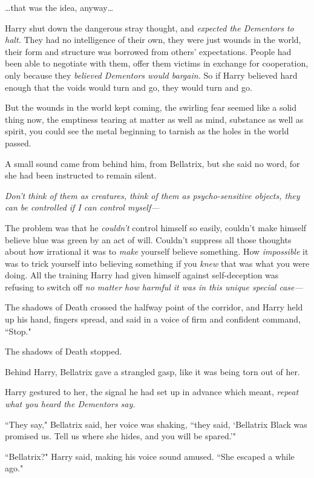 {\ldots}that was the idea, anyway{\ldots}

Harry shut down the dangerous stray thought, and \emph{expected the Dementors to halt.} They had no intelligence of their own, they were just wounds in the world, their form and structure was borrowed from others' expectations. People had been able to negotiate with them, offer them victims in exchange for cooperation, only because they \emph{believed Dementors would bargain.} So if Harry believed hard enough that the voids would turn and go, they would turn and go.

But the wounds in the world kept coming, the swirling fear seemed like a solid thing now, the emptiness tearing at matter as well as mind, substance as well as spirit, you could see the metal beginning to tarnish as the holes in the world passed.

A small sound came from behind him, from Bellatrix, but she said no word, for she had been instructed to remain silent.

\emph{Don't think of them as creatures, think of them as psycho-sensitive objects, they can be controlled if I can control myself---}

The problem was that he \emph{couldn't} control himself so easily, couldn't make himself believe blue was green by an act of will. Couldn't suppress all those thoughts about how irrational it was to \emph{make} yourself believe something. How \emph{impossible} it was to trick yourself into believing something if you \emph{knew} that was what you were doing. All the training Harry had given himself against self-deception was refusing to switch off \emph{no matter how harmful it was in this unique special case---}

The shadows of Death crossed the halfway point of the corridor, and Harry held up his hand, fingers spread, and said in a voice of firm and confident command, ``Stop."

The shadows of Death stopped.

Behind Harry, Bellatrix gave a strangled gasp, like it was being torn out of her.

Harry gestured to her, the signal he had set up in advance which meant, \emph{repeat what you heard the Dementors say.}

``They say," Bellatrix said, her voice was shaking, ``they said, `Bellatrix Black was promised us. Tell us where she hides, and you will be spared.'"

``Bellatrix?" Harry said, making his voice sound amused. ``She escaped a while ago."

